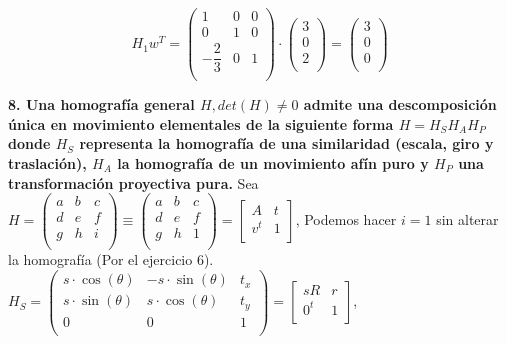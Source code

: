 \documentclass[12pt,a4paper]{article}
\begin{document}
	$$H_1w^T = \begin{pmatrix}
	1 & 0 & 0\\
	0 & 1 & 0\\
	-\dfrac{2}{3} & 0 & 1\\
	\end{pmatrix} \cdot
	\begin{pmatrix}
	3\\
	0\\
	2\\
	\end{pmatrix}=\begin{pmatrix}
	3\\
	0\\
	0\\
	\end{pmatrix}$$ 
	
	
	\newpage
	\textbf{8. Una homografía general $H, det(H)\ne0$ admite una descomposición única en movimiento elementales de la siguiente forma $H=H_SH_AH_P$ donde $H_S$ representa la homografía de una similaridad (escala, giro y traslación), $H_A$ la homografía de un movimiento afín puro y  $H_P$ una transformación proyectiva pura.}
	\newline\newline
	Sea $ H = \begin{pmatrix}
	a & b & c\\
	d & e & f\\
	g & h & i\\
	\end{pmatrix}\equiv \begin{pmatrix}
	a & b & c\\
	d & e & f\\
	g & h & 1\\
	\end{pmatrix}=\begin{bmatrix}
	A & t \\
	v^t & 1\\
	\end{bmatrix}$,\newline
	Podemos hacer $i=1$ sin alterar la homografía (Por el ejercicio 6).\newline
	$H_S=\begin{pmatrix}
	s\cdot\cos(\theta) & -s\cdot\sin(\theta) & t_x\\
	s\cdot\sin(\theta) & s\cdot\cos(\theta) & t_y\\
	0 & 0 & 1 \\ 
	\end{pmatrix}=\begin{bmatrix}
		sR & r \\
		0^t & 1\\
	\end{bmatrix}$,\newline
\end{document}
